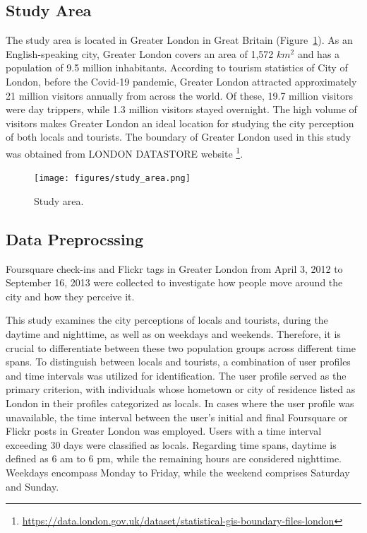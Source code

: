 \documentclass{article}
\theoremstyle{remark}
\begin{document}
\subsection{Study Area}
The study area is located in Greater London in Great Britain (Figure~\ref{fig:study_area}). As an English-speaking
city, Greater London covers an area of 1,572 \(km^2\) and has a population of 9.5 million inhabitants. According to tourism statistics of City of London, before the Covid-19 pandemic, Greater London attracted approximately 21 million visitors annually from across the world. Of these, 19.7 million visitors were day trippers, while 1.3 million visitors stayed overnight. The high volume of visitors makes Greater London an ideal location for studying the city perception of both locals and tourists. The boundary of Greater London used in this study was obtained from LONDON DATASTORE website \footnote{\url{https://data.london.gov.uk/dataset/statistical-gis-boundary-files-london}}.

\begin{figure}[h!]
\centering
\texttt{[image: figures/study\_area.png]}
\caption{\label{fig:study_area}Study area.}
\end{figure}

\subsection{Data Preprocssing} \label{data_preprocessing}
Foursquare check-ins and Flickr tags in Greater London from April 3, 2012 to September 16, 2013 were collected to investigate how people move around the city and how they perceive it.

This study examines the city perceptions of locals and tourists, during the daytime and nighttime, as well as on weekdays and weekends. Therefore, it is crucial to differentiate between these two population groups across different time spans. To distinguish between locals and tourists, a combination of user profiles and time intervals was utilized for identification. The user profile served as the primary criterion, with individuals whose hometown or city of residence listed as London in their profiles categorized as locals. In cases where the user profile was unavailable, the time interval between the user's initial and final Foursquare or Flickr posts in Greater London was employed. Users with a time interval exceeding 30 days were classified as locals. Regarding time spans, daytime is defined as 6 am to 6 pm, while the remaining hours are considered nighttime. Weekdays encompass Monday to Friday, while the weekend comprises Saturday and Sunday.
\end{document}
